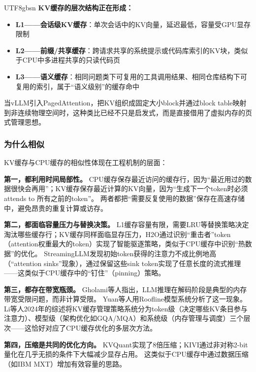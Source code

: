 \documentclass[11pt,a4paper]{article}
\begin{document}
\begin{CJK*}{UTF8}{gbsn}
\textbf{KV缓存的层次结构正在形成：}
\begin{itemize}[nosep]
\item \textbf{L1——会话级KV缓存}：单次会话中的KV向量，延迟最低，容量受GPU显存限制
\item \textbf{L2——前缀/共享缓存}：跨请求共享的系统提示或代码库索引的KV块，类似于CPU中多进程共享的只读代码页\cite{vllm_prefix_2026,sglang_docs_2026,gim2024promptcache}
\item \textbf{L3——语义缓存}：相同问题类下可复用的工具调用结果、相同仓库结构下可复用的索引，属于``语义级别''的缓存命中
\end{itemize}

当vLLM引入PagedAttention，把KV组织成固定大小block并通过block table映射到非连续物理空间时，这种类比已经不只是启发式，而是直接借用了虚拟内存的页式管理思想\cite{kwon2023pagedattention}。

\subsubsection{为什么相似}

KV缓存与CPU缓存的相似性体现在工程机制的层面：

\textbf{第一，都利用时间局部性。}
CPU缓存保存最近访问的缓存行，因为``最近用过的数据很快会再用''；KV缓存保存最近计算的KV向量，因为``生成下一个token时必须 attends to 所有之前的token''。
两者都把``需要反复使用的数据''保存在高速存储中，避免昂贵的重复计算或访存。

\textbf{第二，都面临容量压力与替换决策。}
L1缓存容量有限，需要LRU等替换策略决定淘汰哪些缓存行；KV缓存同样面临显存压力，H2O通过识别``重击者''token（attention权重最大的token）实现了智能驱逐策略\cite{h2o2023}，类似于CPU缓存中识别``热数据''的优化。
StreamingLLM发现初始token获得的注意力不成比例地高（``attention sinks''现象），通过保留这些sink token实现了任意长度的流式推理\cite{xiao2024streamingllm}——这类似于CPU缓存中的``钉住''（pinning）策略。

\textbf{第三，都存在带宽瓶颈。}
Gholami等人指出，LLM推理在解码阶段是典型的内存带宽受限问题，而非计算受限\cite{gholami2024memorywall}。
Yuan等人用Roofline模型系统分析了这一现象\cite{yuan2024llminference}。
Li等人2024年的综述将KV缓存管理策略系统分为token级（决定哪些KV条目参与注意力）、模型级（架构优化如GQA/MQA）和系统级（内存管理与调度）三个层次\cite{likvcache2024survey}——这恰好对应了CPU缓存优化的多层次方法。

\textbf{第四，压缩是共同的优化方向。}
KVQuant实现了8倍压缩\cite{hooper2024kvquant}；KIVI通过非对称2-bit量化在几乎无损的条件下大幅减少显存占用\cite{liu2024kivi}。
这类似于CPU缓存中通过数据压缩（如IBM MXT）增加有效容量的思路。


\end{CJK*}
\end{document}
